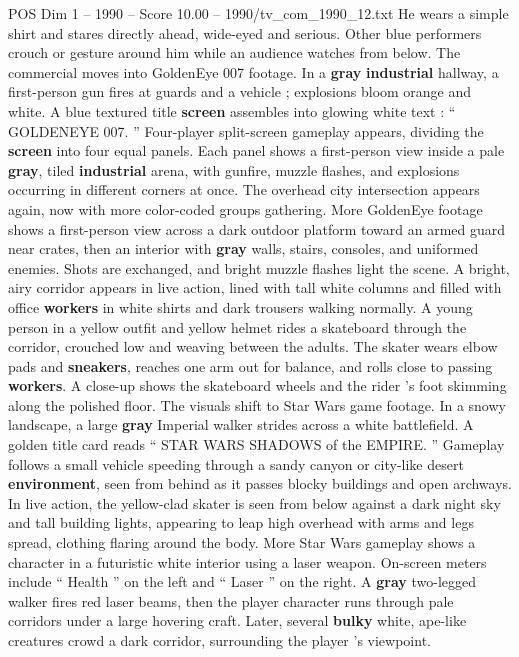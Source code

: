 \begin{textsample}{POS Dim 1 – 1990 – Score 10.00 – 1990/tv\_com\_1990\_12.txt}
He wears a simple shirt and stares directly ahead, wide-eyed and serious.
Other blue performers crouch or gesture around him while an audience watches from below.
The commercial moves into GoldenEye 007 footage.
In a \textbf{gray} \textbf{industrial} hallway, a first-person gun fires at guards and a vehicle ; explosions bloom orange and white.
A blue textured title \textbf{screen} assembles into glowing white text : “ GOLDENEYE 007. ” Four-player split-screen gameplay appears, dividing the \textbf{screen} into four equal panels.
Each panel shows a first-person view inside a pale \textbf{gray}, tiled \textbf{industrial} arena, with gunfire, muzzle flashes, and explosions occurring in different corners at once.
The overhead city intersection appears again, now with more color-coded groups gathering.
More GoldenEye footage shows a first-person view across a dark outdoor platform toward an armed guard near crates, then an interior with \textbf{gray} walls, stairs, consoles, and uniformed enemies.
Shots are exchanged, and bright muzzle flashes light the scene.
A bright, airy corridor appears in live action, lined with tall white columns and filled with office \textbf{workers} in white shirts and dark trousers walking normally.
A young person in a yellow outfit and yellow helmet rides a skateboard through the corridor, crouched low and weaving between the adults.
The skater wears elbow pads and \textbf{sneakers}, reaches one arm out for balance, and rolls close to passing \textbf{workers}.
A close-up shows the skateboard wheels and the rider ’s foot skimming along the polished floor.
The visuals shift to Star Wars game footage.
In a snowy landscape, a large \textbf{gray} Imperial walker strides across a white battlefield.
A golden title card reads “ STAR WARS SHADOWS of the EMPIRE. ” Gameplay follows a small vehicle speeding through a sandy canyon or city-like desert \textbf{environment}, seen from behind as it passes blocky buildings and open archways.
In live action, the yellow-clad skater is seen from below against a dark night sky and tall building lights, appearing to leap high overhead with arms and legs spread, clothing flaring around the body.
More Star Wars gameplay shows a character in a futuristic white interior using a laser weapon.
On-screen meters include “ Health ” on the left and “ Laser ” on the right.
A \textbf{gray} two-legged walker fires red laser beams, then the player character runs through pale corridors under a large hovering craft.
Later, several \textbf{bulky} white, ape-like creatures crowd a dark corridor, surrounding the player ’s viewpoint.

\end{textsample}
